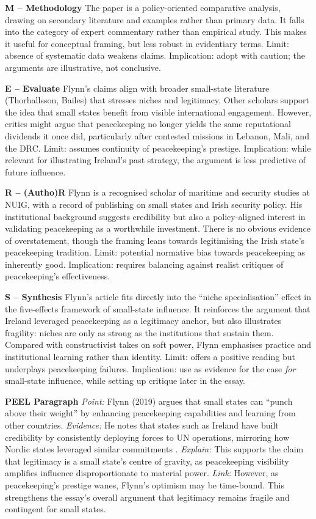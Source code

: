 \textbf{M – Methodology}  
The paper is a policy-oriented comparative analysis, drawing on secondary literature and examples rather than primary data. It falls into the category of expert commentary rather than empirical study. This makes it useful for conceptual framing, but less robust in evidentiary terms. Limit: absence of systematic data weakens claims. Implication: adopt with caution; the arguments are illustrative, not conclusive.

\textbf{E – Evaluate}  
Flynn’s claims align with broader small-state literature (Thorhallsson, Bailes) that stresses niches and legitimacy. Other scholars support the idea that small states benefit from visible international engagement. However, critics might argue that peacekeeping no longer yields the same reputational dividends it once did, particularly after contested missions in Lebanon, Mali, and the DRC. Limit: assumes continuity of peacekeeping’s prestige. Implication: while relevant for illustrating Ireland’s past strategy, the argument is less predictive of future influence.

\textbf{R – (Autho)R}  
Flynn is a recognised scholar of maritime and security studies at NUIG, with a record of publishing on small states and Irish security policy. His institutional background suggests credibility but also a policy-aligned interest in validating peacekeeping as a worthwhile investment. There is no obvious evidence of overstatement, though the framing leans towards legitimising the Irish state’s peacekeeping tradition. Limit: potential normative bias towards peacekeeping as inherently good. Implication: requires balancing against realist critiques of peacekeeping’s effectiveness.

\textbf{S – Synthesis}  
Flynn’s article fits directly into the “niche specialisation” effect in the five-effects framework of small-state influence. It reinforces the argument that Ireland leveraged peacekeeping as a legitimacy anchor, but also illustrates fragility: niches are only as strong as the institutions that sustain them. Compared with constructivist takes on soft power, Flynn emphasises practice and institutional learning rather than identity. Limit: offers a positive reading but underplays peacekeeping failures. Implication: use as evidence for the case \textit{for} small-state influence, while setting up critique later in the essay.

\bigskip
\textbf{PEEL Paragraph}  
\textit{Point:} Flynn (2019) argues that small states can “punch above their weight” by enhancing peacekeeping capabilities and learning from other countries.  
\textit{Evidence:} He notes that states such as Ireland have built credibility by consistently deploying forces to UN operations, mirroring how Nordic states leveraged similar commitments \parencite{FLYNN_2019}.  
\textit{Explain:} This supports the claim that legitimacy is a small state’s centre of gravity, as peacekeeping visibility amplifies influence disproportionate to material power.  
\textit{Link:} However, as peacekeeping’s prestige wanes, Flynn’s optimism may be time-bound. This strengthens the essay’s overall argument that legitimacy remains fragile and contingent for small states.  
  
